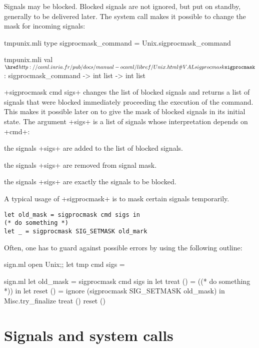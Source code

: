 Signals may be blocked.  Blocked signals are not ignored, but put on 
standby, generally to be delivered later.  The 
 system call makes it possible to change the mask
for incoming signals:
%
\begin{codefile}{tmpunix.mli}
type sigprocmask_command = Unix.sigprocmask_command
\end{codefile}
%
\begin{listingcodefile}{tmpunix.mli}
val $\libvalue{Unix}{sigprocmask}$ : sigprocmask_command -> int list -> int list
\end{listingcodefile}
%
\ml+sigprocmask cmd sigs+ changes the list of blocked signals and 
returns a list of signals that were blocked immediately proceeding 
the execution of the command.  This makes it possible later on to 
give the mask of blocked signals in its initial state.  The argument 
\ml+sigs+ is a list of signals whose interpretation depends on \ml+cmd+:

\begin{mltypecases}
 the signals \ml+sigs+ are added
to the list of blocked signals.

 the signals \ml+sigs+ are removed
from signal mask.

 the signals \ml+sigs+ are exactly the 
signals to be blocked.
\end{mltypecases}
%
A typical usage of \ml+sigprocmask+ is to mask certain
signals temporarily.

%
\begin{lstlisting}
let old_mask = sigprocmask cmd sigs in 
(* do something *)
let _ = sigprocmask SIG_SETMASK old_mark
\end{lstlisting}
%
Often, one has to guard against possible errors by using
the following outline:

%
\begin{codefile}{sign.ml}
open Unix;;
let tmp cmd sigs = 
\end{codefile}
%
\begin{listingcodefile}{sign.ml}
let old_mask = sigprocmask cmd sigs in 
let treat () = ((* do something *)) in
let reset () = ignore (sigprocmask SIG_SETMASK old_mask) in
Misc.try_finalize treat () reset ()
\end{listingcodefile}

\section{Signals and system calls} 

